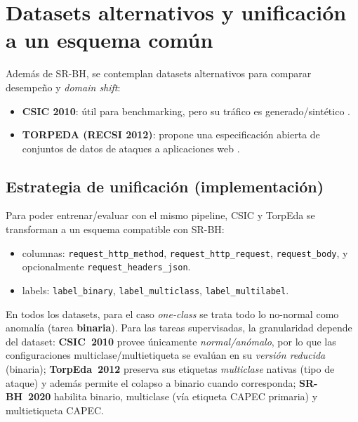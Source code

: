 \documentclass[12pt,oneside]{report}
\begin{document}
\section{Datasets alternativos y unificación a un esquema común}
Además de SR-BH, se contemplan datasets alternativos para comparar desempeño y \textit{domain shift}:
\begin{itemize}[leftmargin=*]
  \item \textbf{CSIC 2010}: útil para benchmarking, pero su tráfico es generado/sintético \cite{csic2010_impact}.
  \item \textbf{TORPEDA (RECSI 2012)}: propone una especificación abierta de conjuntos de datos de ataques a aplicaciones web \cite{torpeda_2012}.
\end{itemize}

\subsection{Estrategia de unificación (implementación)}
Para poder entrenar/evaluar con el mismo pipeline, CSIC y TorpEda se transforman a un esquema compatible con SR-BH:
\begin{itemize}[leftmargin=*]
  \item columnas: \texttt{request\_http\_method}, \texttt{request\_http\_request}, \texttt{request\_body}, y opcionalmente \texttt{request\_headers\_json}.
  \item labels: \texttt{label\_binary}, \texttt{label\_multiclass}, \texttt{label\_multilabel}.
\end{itemize}

En todos los datasets, para el caso \textit{one-class} se trata todo lo no-normal como anomalía (tarea \textbf{binaria}). Para las tareas supervisadas, la granularidad depende del dataset: \textbf{CSIC~2010} provee únicamente \textit{normal/anómalo}, por lo que las configuraciones multiclase/multietiqueta se evalúan en su \textit{versión reducida} (binaria); \textbf{TorpEda~2012} preserva sus etiquetas \textit{multiclase} nativas (tipo de ataque) y además permite el colapso a binario cuando corresponda; \textbf{SR-BH~2020} habilita binario, multiclase (vía etiqueta CAPEC primaria) y multietiqueta CAPEC.
\end{document}
